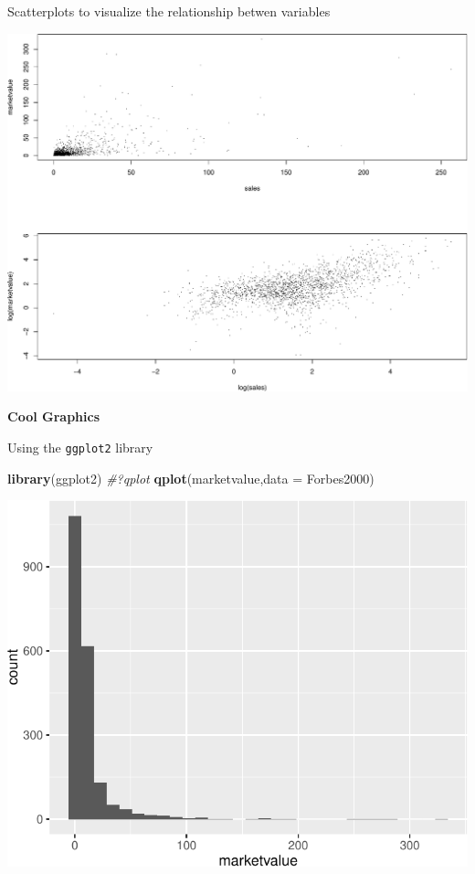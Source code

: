 \documentclass[]{article}
\newenvironment{Shaded}{\begin{snugshade}}{\end{snugshade}}
\newcommand{\KeywordTok}[1]{\textcolor[rgb]{0.13,0.29,0.53}{\textbf{{#1}}}}
\newcommand{\DataTypeTok}[1]{\textcolor[rgb]{0.13,0.29,0.53}{{#1}}}
\newcommand{\CommentTok}[1]{\textcolor[rgb]{0.56,0.35,0.01}{\textit{{#1}}}}
\newcommand{\NormalTok}[1]{{#1}}
\numberwithin{equation}{section}
\begin{document}
Scatterplots to visualize the relationship betwen variables

\includegraphics{index_files/figure-latex/unnamed-chunk-253-1.pdf}

\textbf{Cool Graphics}

Using the \texttt{ggplot2} library

\begin{Shaded}
\begin{Highlighting}[]
\KeywordTok{library}\NormalTok{(ggplot2)}
\CommentTok{#?qplot}
\KeywordTok{qplot}\NormalTok{(marketvalue,}\DataTypeTok{data =} \NormalTok{Forbes2000)}
\end{Highlighting}
\end{Shaded}

\includegraphics{index_files/figure-latex/unnamed-chunk-254-1.pdf}
\end{document}
